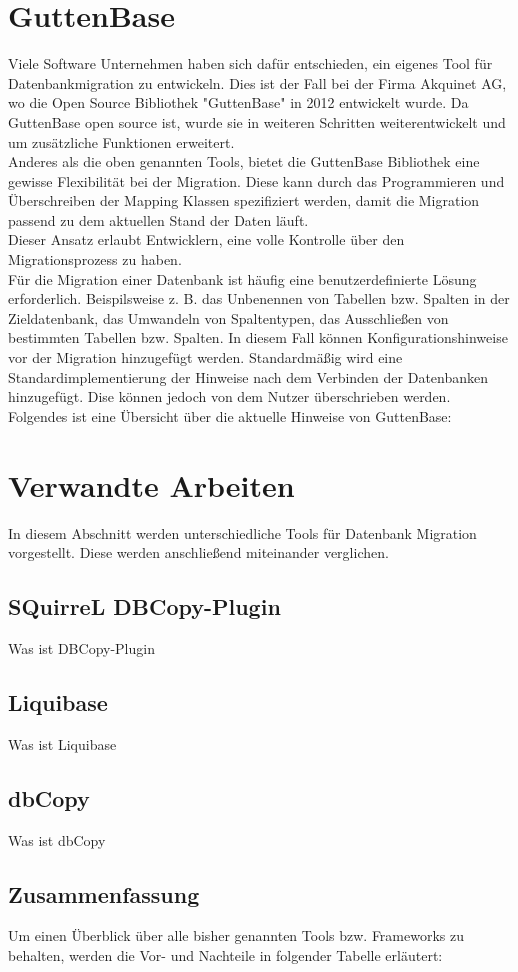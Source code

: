 \section{GuttenBase}
Viele Software Unternehmen haben sich dafür entschieden, ein eigenes Tool für Datenbankmigration zu entwickeln. Dies ist der Fall bei der Firma Akquinet AG, wo die Open Source Bibliothek "GuttenBase" in 2012 entwickelt wurde. Da GuttenBase open source ist, wurde sie in weiteren Schritten weiterentwickelt und um zusätzliche Funktionen erweitert.\\
Anderes als die oben genannten Tools, bietet die GuttenBase Bibliothek eine gewisse Flexibilität bei der Migration. Diese kann durch das Programmieren und Überschreiben der Mapping Klassen spezifiziert werden, damit die Migration passend zu dem aktuellen Stand der Daten läuft.\\
Dieser Ansatz erlaubt Entwicklern, eine volle Kontrolle über den Migrationsprozess zu haben.\\
Für die Migration einer Datenbank ist häufig eine benutzerdefinierte Lösung erforderlich. Beispilsweise z. B. das Unbenennen von Tabellen bzw. Spalten in der Zieldatenbank, das Umwandeln von Spaltentypen, das Ausschließen von bestimmten Tabellen bzw. Spalten.
In diesem Fall können Konfigurationshinweise vor der Migration hinzugefügt werden. Standardmäßig wird eine Standardimplementierung der Hinweise nach dem Verbinden der Datenbanken hinzugefügt. Dise können jedoch von dem Nutzer überschrieben werden. \\
Folgendes ist eine Übersicht über die aktuelle Hinweise von GuttenBase: \\



\section{Verwandte Arbeiten}
In diesem Abschnitt werden unterschiedliche Tools für Datenbank Migration vorgestellt. Diese werden anschließend miteinander verglichen.
\subsection{SQuirreL DBCopy-Plugin}
Was ist DBCopy-Plugin
\subsection{Liquibase}
Was ist Liquibase
\subsection{dbCopy}
Was ist dbCopy




\subsection{Zusammenfassung}
Um einen Überblick über alle bisher genannten Tools bzw. Frameworks zu behalten, werden die Vor- und Nachteile in folgender Tabelle erläutert: \\
